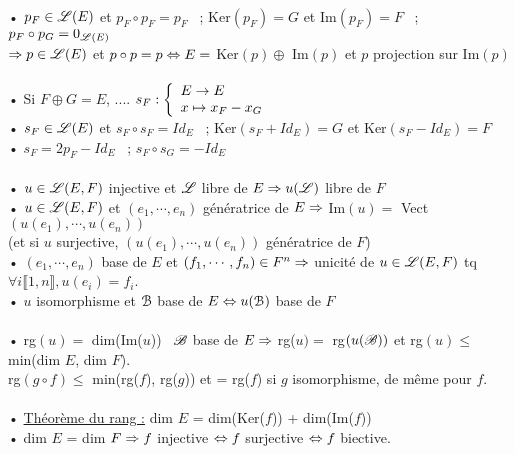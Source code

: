 \documentclass[12 pt]{book}
\begin{document}
\begin{flushleft}
\begin{doublespace}
	 \text{ }\\
	 • $p_F\in\mathscr{L}(E)$ et $p_F\circ p_F = p_F$ \ ; Ker$(p_F) = G$ et Im$(p_F) = F$ \ ; $p_F\circ p_G = 0_{\mathscr{L}(E)}$\\
	\qquad $\Rightarrow p\in \mathscr{L}(E)$ et $p\circ p = p \Leftrightarrow E =$ Ker$(p)\oplus$ Im$(p)$ et $p$ projection sur Im$(p)$\\
	\text{ }\\
	• Si $F\oplus G = E$, .... $s_F :  \left\{\begin{array}{ll} E \rightarrow E \\ x\mapsto x_F-x_G \end{array} \right.$\\
	\qquad • $s_F \in\mathscr{L}(E)$ et $s_F\circ s_F = Id_E$ \ ; Ker$(s_F + Id_E) = G$ et Ker$(s_F - Id_E) = F$\\
	• $s_F = 2 p_F - Id_E$ \ ; $s_F\circ s_G = - Id_E$\\
	\text{ }\\
	• $u\in\mathscr{L}(E,F)$ injective et $\mathscr{L}$ libre de $E \Rightarrow u(\mathscr{L})$ libre de $F$\\
	• $u\in\mathscr{L}(E,F)$ et $(e_1,\cdots , e_n)$ génératrice de $E \Rightarrow $ Im$(u) =$ Vect$(u(e_1),\cdots, u(e_n))$\\
	\quad (et si $u$ surjective, $(u(e_1),\cdots,u(e_n))$ génératrice de $F$)\\
	• $(e_1,\cdots,e_n)$ base de $E$ et $(f_1,\cdots,f_n)\in F^n \Rightarrow$ unicité de $u\in\mathscr{L}(E,F)$ tq $\forall i \llbracket 1,n\rrbracket , u(e_i) =f_i$.\\
	• $u$ isomorphisme et $\mathcal{B}$ base de $E \Leftrightarrow u(\mathcal{B})$ base de $F$\\
	
	\text{ }\\
	• rg$(u) =$ dim(Im($u$)) \ $\mathscr{B}$ base de $E \Rightarrow$ rg($u) = $ rg$(u(\mathscr{B}))$ et rg$(u) \leq$ min(dim $E$, dim $F$).\\
	rg$(g\circ f) \leq$ min(rg($f$), rg($g$)) et = rg($f$) si $g$ isomorphisme, de même pour $f$.\\
	
	\text{ }\\
	• \underline{Théorème du rang :} dim $E$ = dim(Ker($f$)) + dim(Im($f$))\\
	• dim $E$ = dim $F \Rightarrow f$ injective $\Leftrightarrow f$ surjective $\Leftrightarrow f$ biective.\\
	

\end{doublespace}
\end{flushleft}
\end{document}
